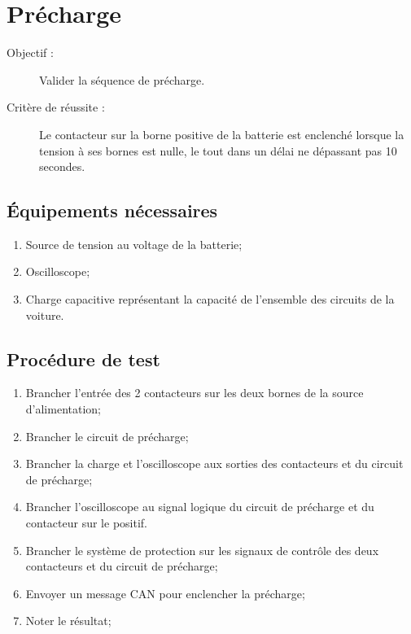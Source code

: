 
\section{Précharge}

\begin{description}
	\item[Objectif :] Valider la séquence de précharge.
	\item[Critère de réussite :] Le contacteur sur la borne positive de la batterie est enclenché lorsque la tension à ses bornes est nulle, le tout dans un délai ne dépassant pas 10 secondes.
\end{description}

\subsection*{Équipements nécessaires}
\begin{enumerate}
	\item Source de tension au voltage de la batterie;
	\item Oscilloscope;
	\item Charge capacitive représentant la capacité de l'ensemble des circuits de la voiture.
\end{enumerate}	

\subsection*{Procédure de test}
\begin{enumerate}
	\item Brancher l'entrée des 2 contacteurs sur les deux bornes de la source d'alimentation;
	\item Brancher le circuit de précharge;
	\item Brancher la charge et l'oscilloscope aux sorties des contacteurs et du circuit de précharge;
	\item Brancher l'oscilloscope au signal logique du circuit de précharge et du contacteur sur le positif.
	\item Brancher le système de protection sur les signaux de contrôle des deux contacteurs et du circuit de précharge;
	\item Envoyer un message CAN pour enclencher la précharge;
	\item Noter le résultat; 
\end{enumerate}